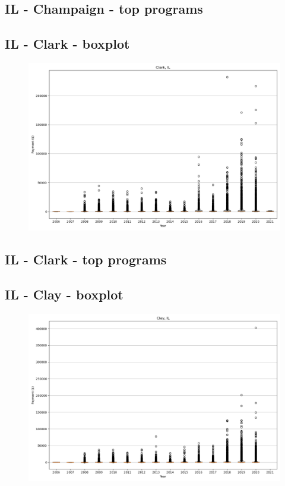 \subsection*{IL - Champaign - top programs}

\newpage
\subsection*{IL - Clark - boxplot}
\begin{figure}[h]
\centering
\includegraphics[width=7in]{../output/boxplots/counties/Clark-IL_boxplot.png}
\end{figure}


\subsection*{IL - Clark - top programs}

\newpage
\subsection*{IL - Clay - boxplot}
\begin{figure}[h]
\centering
\includegraphics[width=7in]{../output/boxplots/counties/Clay-IL_boxplot.png}
\end{figure}


